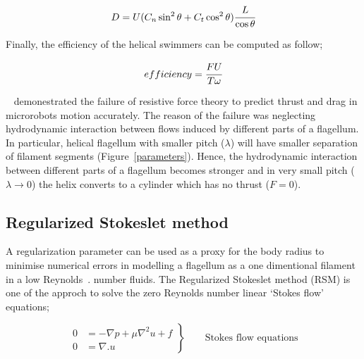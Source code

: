 \documentclass[12pt,a4paper,titlepage]{report}
\begin{document}
\begin{equation}
 D = U (C_n \sin ^2 \theta + C_t \cos ^2 \theta) \cfrac{L}{\cos \theta} 
\label{drag}
\end{equation}



Finally, the efficiency of the helical swimmers can be computed as follow;



\begin{equation}
 efficiency = \cfrac{FU}{T \omega} 
\label{efficiency}
\end{equation}

 

\citeauthor{rodenborn2013propulsion}~\citep{rodenborn2013propulsion} demonestrated the failure of resistive force
 theory to predict thrust and drag in microrobots motion accurately. The reason of the failure was neglecting hydrodynamic
interaction between flows induced by different parts of a flagellum. In particular, helical flagellum with
 smaller pitch ($\lambda$) will have smaller separation of filament segments (Figure~\ref{parameters}). Hence,
 the hydrodynamic interaction between different parts of a flagellum becomes stronger and in very small
pitch ($\lambda \to 0$) the helix converts to a cylinder which has no thrust ($F= 0$).

 





\subsection{Regularized Stokeslet method}\label{method2}

A regularization parameter can be used as a proxy for the body radius to minimise numerical errors
 in modelling a flagellum as a one dimentional filament in a low Reynolds~\citep{smith2009boundary}.
number fluids. The Regularized Stokeslet method (RSM) is one of the approch to solve the zero 
Reynolds number linear \lq{}Stokes flow\rq{} equations;



\begin{equation}
 \left.\begin{aligned}
        0 &= - \nabla p + \mu \nabla ^ 2 u + f \\
        0 &=\nabla . u
       \end{aligned}
 \right\}
 \qquad \text{Stokes flow equations}
\label{stokes}
\end{equation}
\end{document}
